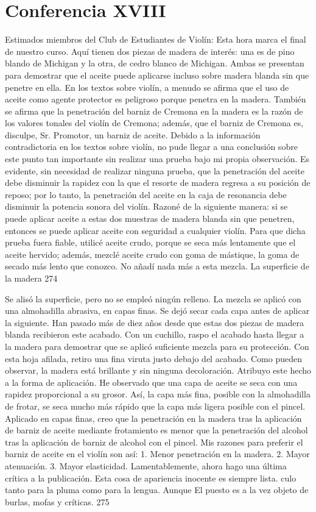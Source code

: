 \chapter*{Conferencia XVIII}
Estimados miembros del Club de Estudiantes de Violín: Esta hora marca el final de nuestro curso. Aquí tienen dos piezas de madera de interés: una es de pino blando de Michigan y la otra, de cedro blanco de Michigan. Ambas se presentan para demostrar que el aceite puede aplicarse incluso sobre madera blanda sin que penetre en ella. En los textos sobre violín, a menudo se afirma que el uso de aceite como agente protector es peligroso porque penetra en la madera. También se afirma que la penetración del barniz de Cremona en la madera es la razón de los valores tonales del violín de Cremona; además, que el barniz de Cremona es, disculpe, Sr. Promotor, un barniz de aceite. Debido a la información contradictoria en los textos sobre violín, no pude llegar a una conclusión sobre este punto tan importante sin realizar una prueba bajo mi propia observación.
Es evidente, sin necesidad de realizar ninguna prueba, que la penetración del aceite debe disminuir la rapidez con la que el resorte de madera regresa a su posición de reposo; por lo tanto, la penetración del aceite en la caja de resonancia debe disminuir la potencia sonora del violín. Razoné de la siguiente manera: si se puede aplicar aceite a estas dos muestras de madera blanda sin que penetren, entonces se puede aplicar aceite con seguridad a cualquier violín. Para que dicha prueba fuera fiable, utilicé aceite crudo, porque se seca más lentamente que el aceite hervido; además, mezclé aceite crudo con goma de mástique, la goma de secado más lento que conozco. No añadí nada más a esta mezcla. La superficie de la madera
274

Se alisó la superficie, pero no se empleó ningún relleno. La mezcla se aplicó con una almohadilla abrasiva, en capas finas. Se dejó secar cada capa antes de aplicar la siguiente.
Han pasado más de diez años desde que estas dos piezas de madera blanda recibieron este acabado. Con un cuchillo, raspo el acabado hasta llegar a la madera para demostrar que se aplicó suficiente mezcla para su protección. Con esta hoja afilada, retiro una fina viruta justo debajo del acabado. Como pueden observar, la madera está brillante y sin ninguna decoloración. Atribuyo este hecho a la forma de aplicación. He observado que una capa de aceite se seca con una rapidez proporcional a su grosor. Así, la capa más fina, posible con la almohadilla de frotar, se seca mucho más rápido que la capa más ligera posible con el pincel. Aplicado en capas finas, creo que la penetración en la madera tras la aplicación de barniz de aceite mediante frotamiento es menor que la penetración del alcohol tras la aplicación de barniz de alcohol con el pincel. Mis razones para preferir el barniz de aceite en el violín
son así:
1. Menor penetración en la madera.
2. Mayor atenuación.
3. Mayor elasticidad.
Lamentablemente, ahora hago una última crítica a la publicación. Esta cosa de apariencia inocente es siempre lista.
culo tanto para la pluma como para la lengua. Aunque
El puesto es a la vez objeto de burlas, mofas y críticas. 275


